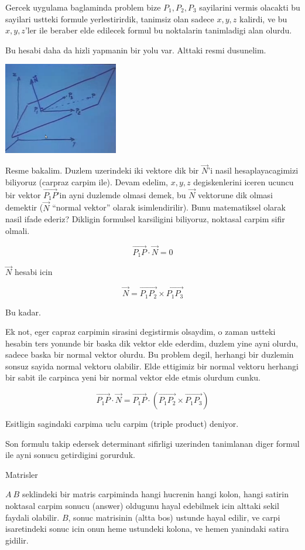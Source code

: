 \documentclass[12pt,fleqn]{article}
\begin{document}
Gercek uygulama baglaminda problem bize $P_1,P_2,P_3$ sayilarini vermis
olacakti bu sayilari ustteki formule yerlestirirdik, tanimsiz olan sadece
$x,y,z$ kalirdi, ve bu $x,y,z$'ler ile beraber elde edilecek formul bu
noktalarin tanimladigi alan olurdu.

Bu hesabi daha da hizli yapmanin bir yolu var. Alttaki resmi dusunelim. 

\includegraphics[height=4cm]{3_3.png}

Resme bakalim. Duzlem uzerindeki iki vektore dik bir $\vec{N}$'i nasil
hesaplayacagimizi biliyoruz (carpraz carpim ile). Devam edelim, $x,y,z$
degiskenlerini iceren ucuncu bir vektor $\vec{P_1P}$'in ayni duzlemde
olmasi demek, bu $\vec{N}$ vektorune dik olmasi demektir ($\vec{N}$
``normal vektor'' olarak isimlendirilir). Bunu matematiksel olarak nasil
ifade ederiz? Dikligin formulsel karsiligini biliyoruz, noktasal carpim
sifir olmali.

\[ \vec{P_1P} \cdot \vec{N} = 0 \]

$\vec{N}$ hesabi icin 

\[ \vec{N} = \vec{P_1P_2} \times \vec{P_1P_3}\]

Bu kadar. 

Ek not, eger capraz carpimin sirasini degistirmis olsaydim, o zaman ustteki
hesabin ters yonunde bir baska dik vektor elde ederdim, duzlem yine ayni
olurdu, sadece baska bir normal vektor olurdu. Bu problem degil, herhangi
bir duzlemin sonsuz sayida normal vektoru olabilir. Elde ettigimiz bir
normal vektoru herhangi bir sabit ile carpinca yeni bir normal vektor elde
etmis olurdum cunku. 

\[ \vec{P_1P} \cdot \vec{N} = 
\vec{P_1P} \cdot (\vec{P_1P_2} \times \vec{P_1P_3})
\]

Esitligin sagindaki carpima uclu carpim (triple product) deniyor. 

Son formulu takip edersek determinant sifirligi uzerinden tanimlanan diger
formul ile ayni sonucu getirdigini gorurduk. 

Matrisler

$A \ B$ seklindeki bir matris carpiminda hangi hucrenin hangi kolon, hangi
satirin noktasal carpim sonucu (answer) oldugunu hayal edebilmek icin
alttaki sekil faydali olabilir. $B$, sonuc matrisinin (altta bos) ustunde
hayal edilir, ve carpi isaretindeki sonuc icin onun heme ustundeki kolona,
ve hemen yanindaki satira gidilir.
\end{document}
